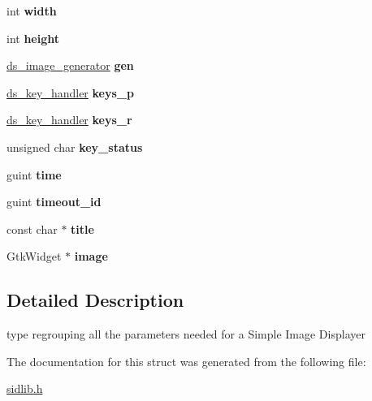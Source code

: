\begin{DoxyCompactItemize}
\item 
\mbox{\label{structsimple__image__displayer__t_a1435fba3e71e8a1be1c42ffed2f57daf}} 
int {\bfseries width}
\item 
\mbox{\label{structsimple__image__displayer__t_a153fb3ac9d2c5a76500b9b87e75563c4}} 
int {\bfseries height}
\item 
\mbox{\label{structsimple__image__displayer__t_aec4843261d97abd10612654b0836040e}} 
\hyperlink{sidlib_8h_a9af3774c328a6ae6add97d212d5cd2ec}{ds\+\_\+image\+\_\+generator} {\bfseries gen}
\item 
\mbox{\label{structsimple__image__displayer__t_a232edd1a6a279cf544b542956ee6e617}} 
\hyperlink{sidlib_8h_ae7f399563eabb6f589356887b3db1e61}{ds\+\_\+key\+\_\+handler} {\bfseries keys\+\_\+p}
\item 
\mbox{\label{structsimple__image__displayer__t_a89c4cfe0b887ddb91273179d07b7849c}} 
\hyperlink{sidlib_8h_ae7f399563eabb6f589356887b3db1e61}{ds\+\_\+key\+\_\+handler} {\bfseries keys\+\_\+r}
\item 
\mbox{\label{structsimple__image__displayer__t_ab23aee526e8bcef668ed692f5e28ec04}} 
unsigned char {\bfseries key\+\_\+status}
\item 
\mbox{\label{structsimple__image__displayer__t_a8dae48c0b5ff55cc9c7076478bb01edc}} 
guint {\bfseries time}
\item 
\mbox{\label{structsimple__image__displayer__t_af7a541cf8e1751b203d739ac19b3aa51}} 
guint {\bfseries timeout\+\_\+id}
\item 
\mbox{\label{structsimple__image__displayer__t_aa07a605bf6e42ab83d43cb323d658c59}} 
const char $\ast$ {\bfseries title}
\item 
\mbox{\label{structsimple__image__displayer__t_af1b06a875f3b2e15e2fbae504caf82d7}} 
Gtk\+Widget $\ast$ {\bfseries image}
\end{DoxyCompactItemize}


\subsection{Detailed Description}
type regrouping all the parameters needed for a Simple Image Displayer 

The documentation for this struct was generated from the following file\+:\begin{DoxyCompactItemize}
\item 
\hyperlink{sidlib_8h}{sidlib.\+h}\end{DoxyCompactItemize}

